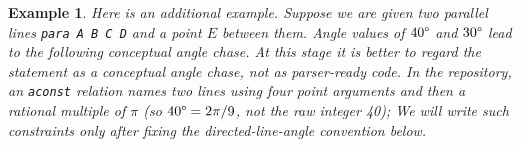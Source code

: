 \documentclass[reqno]{amsart}
\DeclareMathOperator{\1}{\textbf{1}}
\newtheorem{example}[thm]{Example}
\begin{document}
\begin{example}
    Here is an additional example. Suppose we are given two parallel lines
    \verb|para A B C D| and a point $E$ between them. Angle values of
    $40\degree$ and $30\degree$ lead to the following conceptual angle chase.
    At this stage it is better to regard the statement as a conceptual angle
    chase, not as parser-ready code. In the repository, an \verb|aconst|
    relation names two lines using four point arguments and then a rational
    multiple of $\pi$ (so $40\degree=2\pi/9$, not the raw integer 40);
    We will write such constraints only after fixing the directed-line-angle
    convention below.

    \begin{center}
\end{center}
\end{example}
\end{document}
